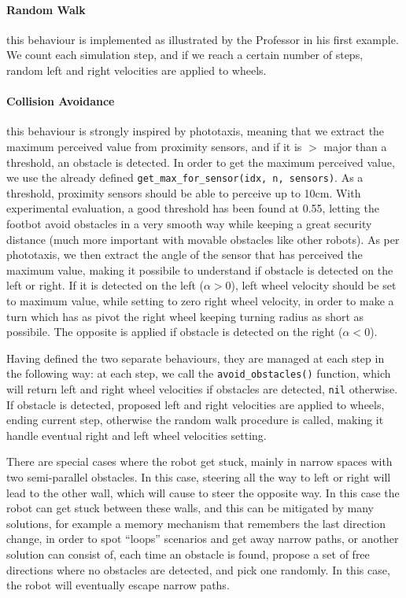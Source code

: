 \paragraph{Random Walk} this behaviour is implemented as illustrated by the
Professor in his first example. We count each simulation step, and if we reach
a certain number of steps, random left and right velocities are applied to
wheels.

\paragraph{Collision Avoidance} this behaviour is strongly inspired by
phototaxis, meaning that we extract the maximum perceived value from proximity
sensors, and if it is $>$ major than a threshold, an obstacle is detected. In
order to get the maximum perceived value, we use the already defined
\texttt{get\_max\_for\_sensor(idx, n, sensors)}. As a threshold, proximity
sensors should be able to perceive up to 10cm. With experimental evaluation, a
good threshold has been found at 0.55, letting the footbot avoid obstacles in a
very smooth way while keeping a great security distance (much more important
with movable obstacles like other robots). As per phototaxis, we then extract
the angle of the sensor that has perceived the maximum value, making it
possibile to understand if obstacle is detected on the left or right. If it is
detected on the left ($\alpha > 0$), left wheel velocity should be set to
maximum value, while setting to zero right wheel velocity, in order to make a
turn which has as pivot the right wheel keeping turning radius as short as
possibile. The opposite is applied if obstacle is detected on the right
($\alpha < 0$).

\bigskip
\noindent
Having defined the two separate behaviours, they are managed at each step in
the following way: at each step, we call the \texttt{avoid\_obstacles()}
function, which will return left and right wheel velocities if obstacles are
detected, \texttt{nil} otherwise. If obstacle is detected, proposed left and
right velocities are applied to wheels, ending current step, otherwise the
random walk procedure is called, making it handle eventual right and left wheel
velocities setting.

There are special cases where the robot get stuck, mainly in narrow spaces with
two semi-parallel obstacles. In this case, steering all the way to left or
right will lead to the other wall, which will cause to steer the opposite way.
In this case the robot can get stuck between these walls, and this can be
mitigated by many solutions, for example a memory mechanism that remembers the
last direction change, in order to spot ``loops'' scenarios and get away narrow
paths, or another solution can consist of, each time an obstacle is found,
propose a set of free directions where no obstacles are detected, and pick one
randomly. In this case, the robot will eventually escape narrow paths.
